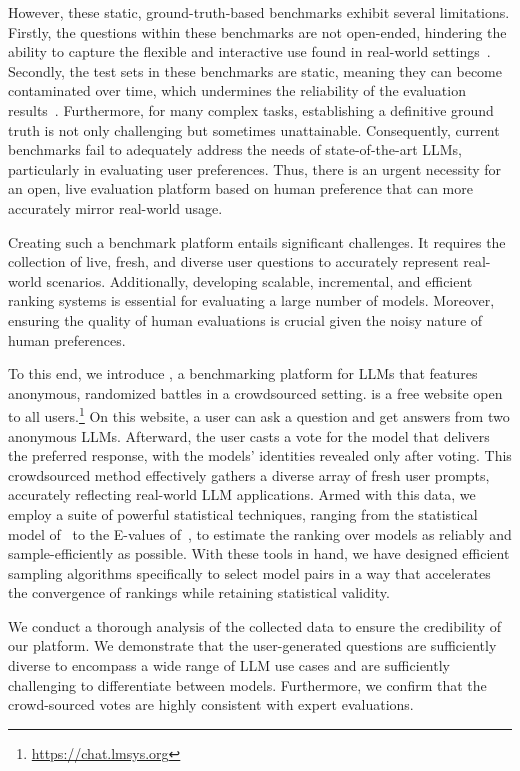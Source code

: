 However, these static, ground-truth-based benchmarks exhibit several limitations. Firstly, the questions within these benchmarks are not open-ended, hindering the ability to capture the flexible and interactive use found in real-world settings~\cite{zheng2023judging}. Secondly, the test sets in these benchmarks are static, meaning they can become contaminated over time, which undermines the reliability of the evaluation results~\cite{yang2023rethinking}. Furthermore, for many complex tasks, establishing a definitive ground truth is not only challenging but sometimes unattainable. Consequently, current benchmarks fail to adequately address the needs of state-of-the-art LLMs, particularly in evaluating user preferences. Thus, there is an urgent necessity for an open, live evaluation platform based on human preference that can more accurately mirror real-world usage.

Creating such a benchmark platform entails significant challenges. It requires the collection of live, fresh, and diverse user questions to accurately represent real-world scenarios. Additionally, developing scalable, incremental, and efficient ranking systems is essential for evaluating a large number of models. Moreover, ensuring the quality of human evaluations is crucial given the noisy nature of human preferences.

To this end, we introduce \system, a benchmarking platform for LLMs that features anonymous, randomized battles in a crowdsourced setting. \system is a free website open to all users.\footnote{\url{https://chat.lmsys.org}} On this website, a user can ask a question and get answers from two anonymous LLMs.
Afterward, the user casts a vote for the model that delivers the preferred response, with the models' identities revealed only after voting. This crowdsourced method effectively gathers a diverse array of fresh user prompts, accurately reflecting real-world LLM applications. 
Armed with this data, we employ a suite of powerful statistical techniques, ranging from the statistical model of~\citet{bradley1952rank} to the E-values of~\citet{vovk2021values}, to estimate the ranking over models as reliably and sample-efficiently as possible.
With these tools in hand, we have designed efficient sampling algorithms specifically to select model pairs in a way that accelerates the convergence of rankings while retaining statistical validity.

We conduct a thorough analysis of the collected data to ensure the credibility of our platform. We demonstrate that the user-generated questions are sufficiently diverse to encompass a wide range of LLM use cases and are sufficiently challenging to differentiate between models. Furthermore, we confirm that the crowd-sourced votes are highly consistent with expert evaluations.

